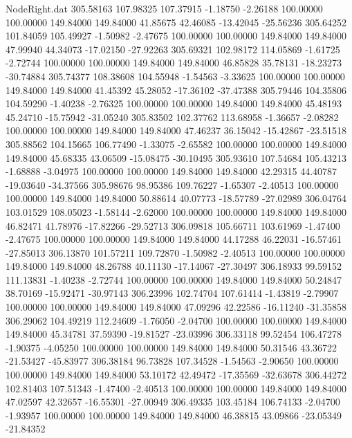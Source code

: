 \begin{filecontents}{NodeRight.dat}
 305.58163  107.98325  107.37915    -1.18750   -2.26188  100.00000  100.00000  149.84000  149.84000   41.85675   42.46085  -13.42045  -25.56236
 305.64252  101.84059  105.49927    -1.50982   -2.47675  100.00000  100.00000  149.84000  149.84000   47.99940   44.34073  -17.02150  -27.92263
 305.69321  102.98172  114.05869    -1.61725   -2.72744  100.00000  100.00000  149.84000  149.84000   46.85828   35.78131  -18.23273  -30.74884
 305.74377  108.38608  104.55948    -1.54563   -3.33625  100.00000  100.00000  149.84000  149.84000   41.45392   45.28052  -17.36102  -37.47388
 305.79446  104.35806  104.59290    -1.40238   -2.76325  100.00000  100.00000  149.84000  149.84000   45.48193   45.24710  -15.75942  -31.05240
 305.83502  102.37762  113.68958    -1.36657   -2.08282  100.00000  100.00000  149.84000  149.84000   47.46237   36.15042  -15.42867  -23.51518
 305.88562  104.15665  106.77490    -1.33075   -2.65582  100.00000  100.00000  149.84000  149.84000   45.68335   43.06509  -15.08475  -30.10495
 305.93610  107.54684  105.43213    -1.68888   -3.04975  100.00000  100.00000  149.84000  149.84000   42.29315   44.40787  -19.03640  -34.37566
 305.98676   98.95386  109.76227    -1.65307   -2.40513  100.00000  100.00000  149.84000  149.84000   50.88614   40.07773  -18.57789  -27.02989
 306.04764  103.01529  108.05023    -1.58144   -2.62000  100.00000  100.00000  149.84000  149.84000   46.82471   41.78976  -17.82266  -29.52713
 306.09818  105.66711  103.61969    -1.47400   -2.47675  100.00000  100.00000  149.84000  149.84000   44.17288   46.22031  -16.57461  -27.85013
 306.13870  101.57211  109.72870    -1.50982   -2.40513  100.00000  100.00000  149.84000  149.84000   48.26788   40.11130  -17.14067  -27.30497
 306.18933   99.59152  111.13831    -1.40238   -2.72744  100.00000  100.00000  149.84000  149.84000   50.24847   38.70169  -15.92471  -30.97143
 306.23996  102.74704  107.61414    -1.43819   -2.79907  100.00000  100.00000  149.84000  149.84000   47.09296   42.22586  -16.11240  -31.35858
 306.29062  104.49219  112.24609    -1.76050   -2.04700  100.00000  100.00000  149.84000  149.84000   45.34781   37.59390  -19.81527  -23.03996
 306.33118   99.52454  106.47278    -1.90375   -4.05250  100.00000  100.00000  149.84000  149.84000   50.31546   43.36722  -21.53427  -45.83977
 306.38184   96.73828  107.34528    -1.54563   -2.90650  100.00000  100.00000  149.84000  149.84000   53.10172   42.49472  -17.35569  -32.63678
 306.44272  102.81403  107.51343    -1.47400   -2.40513  100.00000  100.00000  149.84000  149.84000   47.02597   42.32657  -16.55301  -27.00949
 306.49335  103.45184  106.74133    -2.04700   -1.93957  100.00000  100.00000  149.84000  149.84000   46.38815   43.09866  -23.05349  -21.84352

\end{filecontents}
